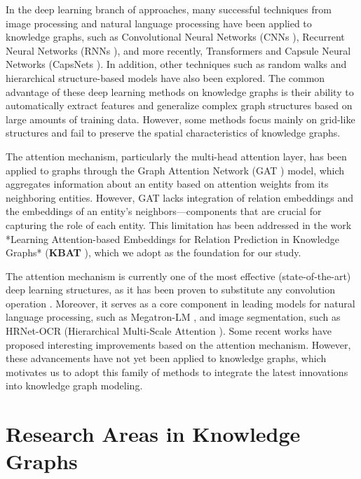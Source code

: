 In the deep learning branch of approaches, many successful techniques from image processing and natural language processing have been applied to knowledge graphs, such as Convolutional Neural Networks (CNNs \cite{lecun1999object}), Recurrent Neural Networks (RNNs \cite{hopfield2007hopfield}), and more recently, Transformers \cite{yang2019xlnet} and Capsule Neural Networks (CapsNets \cite{sabour2017dynamic}). In addition, other techniques such as random walks and hierarchical structure-based models have also been explored. The common advantage of these deep learning methods on knowledge graphs is their ability to automatically extract features and generalize complex graph structures based on large amounts of training data. However, some methods focus mainly on grid-like structures and fail to preserve the spatial characteristics of knowledge graphs.

The attention mechanism, particularly the multi-head attention layer, has been applied to graphs through the Graph Attention Network (GAT \cite{velivckovic2017graph}) model, which aggregates information about an entity based on attention weights from its neighboring entities. However, GAT lacks integration of relation embeddings and the embeddings of an entity's neighbors—components that are crucial for capturing the role of each entity. This limitation has been addressed in the work *Learning Attention-based Embeddings for Relation Prediction in Knowledge Graphs* (\textbf{KBAT} \cite{nathani2019learning}), which we adopt as the foundation for our study.

The attention mechanism is currently one of the most effective (state-of-the-art) deep learning structures, as it has been proven to substitute any convolution operation \cite{cordonnier2019relationship}. Moreover, it serves as a core component in leading models for natural language processing, such as Megatron-LM \cite{shoeybi2019megatron}, and image segmentation, such as HRNet-OCR (Hierarchical Multi-Scale Attention \cite{tao2020hierarchical}). Some recent works \cite{cordonnier2020multi} have proposed interesting improvements based on the attention mechanism. However, these advancements have not yet been applied to knowledge graphs, which motivates us to adopt this family of methods to integrate the latest innovations into knowledge graph modeling.

\section{Research Areas in Knowledge Graphs}


